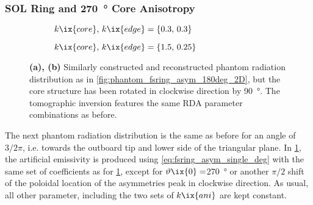             \subsubsection*{SOL Ring and \SI{270}{\degree} Core Anisotropy}%
%
                \begin{figure}[t]%
                    \centering%
                    \begin{subfigure}{\textwidth}%
                        \centering%
                        \caption{$k\ix{core},\,k\ix{edge}=\left\{0.3,\,0.3\right\}$}%
                    \end{subfigure}%
                    \newline%
                    \begin{subfigure}{\textwidth}%
                        \centering%
                        \caption{$k\ix{core},\,k\ix{edge}=\left\{1.5,\,0.25\right\}$}%
                    \end{subfigure}%
                    \caption{\textbf{(a), (b)} Similarly constructed and reconstructed phantom radiation distribution as in \cref{fig:phantom_fsring_asym_180deg_2D}, but the core structure has been rotated in clockwise direction by \SI{90}{\degree}. The tomographic inversion features the same RDA parameter combinations as before.}\label{fig:phantom_fsring_asym_270deg_2D}%
                \end{figure}%
%
                The next phantom radiation distribution is the same as before for an angle of $3/2\pi$, i.e. towards the outboard tip and lower side of the triangular plane. In \cref{fig:phantom_fsring_asym_270deg_2D}, the artificial emissivity is produced using \cref{eq:fsring_asym_single_deg} with the same set of coefficients as for \cref{fig:phantom_fsring_asym_270deg_2D}, except for $\vartheta\ix{0}=$\SI{270}{\degree} or another $\pi/2$ shift of the poloidal location of the asymmetries peak in clockwise direction. As usual, all other parameter, including the two sets of $k\ix{ani}$ are kept constant.\\%
